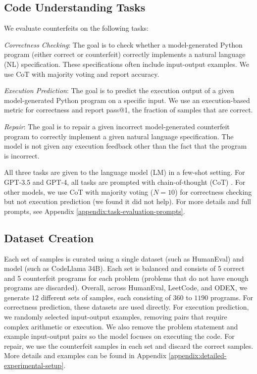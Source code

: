 \subsection{Code Understanding Tasks}
We evaluate counterfeits on the following tasks:

\textit{Correctness Checking}: The goal is to check whether a model-generated Python program (either correct or counterfeit) correctly implements a natural language (NL) specification. These specifications often include input-output examples. We use CoT with majority voting \citep{wei2022chain, wang2022self} and report accuracy.

\textit{Execution Prediction}: The goal is to predict the execution output of a given model-generated Python program on a specific input. We use an execution-based metric for correctness and report pass@1, the fraction of samples that are correct.

\textit{Repair}: The goal is to repair a given incorrect model-generated counterfeit program to correctly implement a given natural language specification. The model is not given any execution feedback other than the fact that the program is incorrect.

All three tasks are given to the language model (LM) in a few-shot setting. For GPT-3.5 and GPT-4, all tasks are prompted with chain-of-thought (CoT) \citep{wei2022chain}. For other models, we use CoT with majority voting ($N=10$) for correctness checking but not execution prediction (we found it did not help). For more details and full prompts, see Appendix \ref{appendix:task-evaluation-prompts}.


\subsection{Dataset Creation}
Each set of samples is curated using a single dataset (such as HumanEval) and model (such as CodeLlama 34B). Each set is balanced and consists of 5 correct and 5 counterfeit programs for each problem (problems that do not have enough programs are discarded). Overall, across HumanEval, LeetCode, and ODEX, we generate $12$ different sets of samples, each consisting of $360$ to $1190$ programs. For correctness prediction, these datasets are used directly. For execution prediction, we randomly selected input-output examples, removing pairs that require complex arithmetic or execution. We also remove the problem statement and example input-output pairs so the model focuses on executing the code. For repair, we use the counterfeit samples in each set and discard the correct samples. More details and examples can be found in Appendix \ref{appendix:detailed-experimental-setup}.
